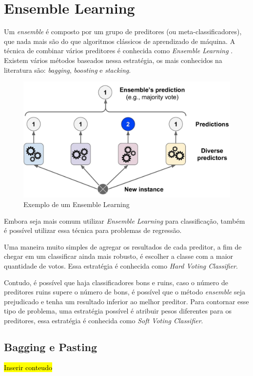 \section{Ensemble Learning}
\label{sec:ensemble}
Um \textit{ensemble} é composto por um grupo de preditores (ou meta-classificadores), que nada mais são do que algoritmos clássicos de aprendizado de máquina. A técnica de combinar vários preditores é conhecida como \textit{Ensemble Learning} \cite{Geron:2017}. Existem vários métodos baseados nessa estratégia, os mais conhecidos na literatura são: \textit{bagging}, \textit{boosting} e \textit{stacking}.

\begin{figure}[h!]
    \centering
    \includegraphics[scale=0.2]{Imagens/ensemble.png}
    \caption{Exemplo de um Ensemble Learning \cite{Geron:2017}}
    \label{fig:ensemble}
\end{figure}

Embora seja mais comum utilizar \textit{Ensemble Learning} para classificação, também é possível utilizar essa técnica para problemas de regressão.

Uma maneira muito simples de agregar os resultados de cada preditor, a fim de chegar em um classificar ainda mais robusto, é escolher a classe com a maior quantidade de votos. Essa estratégia é conhecida como \textit{Hard Voting Classifier}.

Contudo, é possível que haja classificadores bons e ruins, caso o número de preditores ruins supere o número de bons, é possível que o método \textit{ensemble} seja prejudicado e tenha um resultado inferior ao melhor preditor. Para contornar esse tipo de problema, uma estratégia possível é atribuir pesos diferentes para os preditores, essa estratégia é conhecida como \textit{Soft Voting Classifier}.


\subsection{Bagging e Pasting}
\hl{Inserir conteudo}